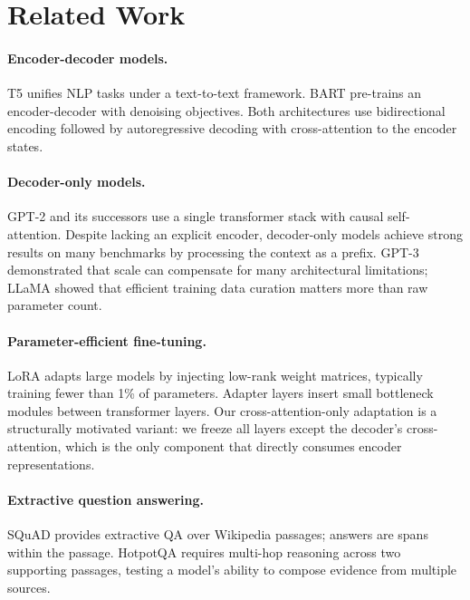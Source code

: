 \documentclass[11pt]{article}
\newcommand{\squad}{SQuAD\xspace}
\newcommand{\hotpotqa}{HotpotQA\xspace}
\begin{document}
\section{Related Work}

\paragraph{Encoder-decoder models.}
T5 \citep{raffel2020exploring} unifies NLP tasks under a text-to-text framework.
BART \citep{lewis2020bart} pre-trains an encoder-decoder with denoising objectives.
Both architectures use bidirectional encoding followed by autoregressive decoding
with cross-attention to the encoder states.

\paragraph{Decoder-only models.}
GPT-2 \citep{radford2019language} and its successors use a single transformer
stack with causal self-attention.
Despite lacking an explicit encoder, decoder-only models achieve strong results on
many benchmarks by processing the context as a prefix.
GPT-3 \citep{brown2020language} demonstrated that scale can compensate for many
architectural limitations; LLaMA \citep{touvron2023llama} showed that efficient
training data curation matters more than raw parameter count.

\paragraph{Parameter-efficient fine-tuning.}
LoRA \citep{hu2022lora} adapts large models by injecting low-rank weight matrices,
typically training fewer than 1\% of parameters.
Adapter layers \citep{houlsby2019parameter} insert small bottleneck modules
between transformer layers.
Our cross-attention-only adaptation is a structurally motivated variant:
we freeze all layers except the decoder's cross-attention, which is the only
component that directly consumes encoder representations.

\paragraph{Extractive question answering.}
\squad \citep{rajpurkar2016squad} provides extractive QA over Wikipedia passages;
answers are spans within the passage.
\hotpotqa \citep{yang2018hotpotqa} requires multi-hop reasoning across two
supporting passages, testing a model's ability to compose evidence from multiple
sources.
\end{document}
